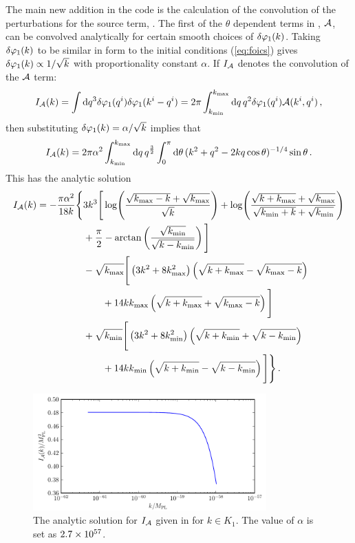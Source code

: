 The main new addition in the code is the calculation of the
convolution of the perturbations for the source term,
. The first of the $\theta$ dependent terms in
, $\mathcal{A}$,
can be convolved analytically for certain smooth choices of $\delta\varphi_{1}(k)$. 
Taking $\delta\varphi_{1}(k)$ to be similar in form to the initial conditions
(\ref{eq:foics}) gives $\delta\varphi_{1}(k)\propto 1/\sqrt{k}$ with proportionality constant
$\alpha$.
If $I_{\mathcal{A}}$ denotes the convolution of the $\mathcal{A}$ term:
% 
\begin{equation}
 I_{\mathcal{A}} (k) = \int \mathrm{d} q^3 \delta\varphi_{1}(q^i) \delta\varphi_{1}(k^i-q^i) 
          = 2\pi \int_{k_{\mathrm{min}}}^{k_{\mathrm{max}}} \mathrm{d} q\, q^2 \delta\varphi_{1}(q^i) \mathcal{A}(k^i, q^i)\,,
\end{equation}
% 
then substituting $\delta\varphi_{1}(k) = \alpha/\sqrt{k}$ implies that
% 
\begin{equation}
 I_{\mathcal{A}}(k) = 2\pi\alpha^2 \int_{k_{\mathrm{min}}}^{k_{\mathrm{max}}} \mathrm{d} q\, q^{\frac{3}{2}}
\int_{0}^{\pi} \mathrm{d}\theta\, (k^2 + q^2 -2k q \cos{\theta})^{-1/4} \sin{\theta}\,. 
\end{equation}
% 
This has the analytic solution
% 
\begin{align}
\label{eq:err-analytic-num}
 I_\A(k) = -\frac{\pi\alpha^2}{18 k}\Bigg\{ 
	&3 k^3 \Bigg[ \log\Biggl(\frac{\sqrt{\kmax-k} + \sqrt{\kmax}}{\sqrt{k}}
			    \Biggr)
	 + \log\Biggl( \frac{\sqrt{k+\kmax} +\sqrt{\kmax}}{\sqrt{\kmin+k} +
		      \sqrt{\kmin}}\Biggr) \nonumber \\
	&+\frac{\pi}{2} - \arctan\left( \frac{\sqrt{\kmin}}{\sqrt{k-\kmin}}\right)
	\Bigg] \nonumber\\
% 
        &-\sqrt{\kmax}\Bigg[ \left(3k^2 + 8\kmax^2 \right)\left(\sqrt{k+\kmax} -
	  \sqrt{\kmax-k}\right) \nonumber \\
	&\qquad + 14k\kmax\left(\sqrt{k+\kmax}+\sqrt{\kmax-k}\right)\Bigg]\nonumber\\
% 
	&+\sqrt{\kmin}\Bigg[ \left(3k^2 + 8\kmin^2 \right)\left(\sqrt{k+\kmin} +
	  \sqrt{k-\kmin}\right) \nonumber \\
	&\qquad +14k\kmin \left(\sqrt{k+\kmin} -
         \sqrt{k-\kmin} \right) \Bigg] \Bigg\} \,.
\end{align}
% 
\begin{figure}[htb]
 \centering
 \includegraphics[width=0.8\textwidth]
    {./numerical/graphs/errors_analytic_aterm-half.pdf}
 \caption{The analytic solution for $I_{\mathcal{A}}$ given in  for
$k\in K_1$. The value of $\alpha$ is set as $2.7\times 10^{57}$.}
 \label{fig:inta-num}
\end{figure}
